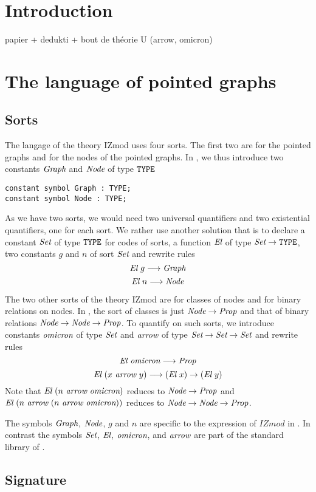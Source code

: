 \documentclass[a4paper]{article}
\begin{document}
\thispagestyle{empty}
\section{Introduction}

papier + dedukti + bout de théorie U (arrow, omicron)

\section{The language of pointed graphs}

\subsection{Sorts}

The langage of the theory IZmod uses four sorts. The first two are for
the pointed graphs and for the nodes of the pointed graphs.  In
\dedukti, we thus introduce two constants ${\mbox{\it Graph}}$ and ${\mbox{\it Node}}$ of type
$\mbox{\tt TYPE}$
\begin{lstlisting}
constant symbol Graph : TYPE;
constant symbol Node : TYPE;
\end{lstlisting}
As we have two sorts, we would need two universal quantifiers and two
existential quantifiers, one for each sort.  We rather use another
solution \cite{theoryU} that is to declare a constant $\mbox{\it Set}$ of type
$\mbox{\tt TYPE}$ for codes of sorts, a function ${\mbox{\it El}}$ of type $\mbox{\it Set} \rightarrow \mbox{\tt TYPE}$,
two constants $g$ and $n$ of sort $\mbox{\it Set}$ and rewrite rules
$${\mbox{\it El}}~g \longrightarrow {\mbox{\it Graph}}$$
$${\mbox{\it El}}~n \longrightarrow {\mbox{\it Node}}$$

The two other sorts of the theory IZmod are for classes of nodes and
for binary relations on nodes.  In \dedukti, the sort of classes is
just ${\mbox{\it Node}} \rightarrow {\mbox{\it Prop}}$ and that of binary relations
${\mbox{\it Node}} \rightarrow {\mbox{\it Node}} \rightarrow {\mbox{\it Prop}}$. To quantify on such sorts, we introduce
constants ${\mbox{\it omicron}}$ of type $\mbox{\it Set}$ and ${\mbox{\it arrow}} $ of type
$\mbox{\it Set} \rightarrow \mbox{\it Set} \rightarrow \mbox{\it Set}$ and rewrite rules
$${\mbox{\it El}}~{\mbox{\it omicron}} \longrightarrow {\mbox{\it Prop}}$$
$${\mbox{\it El}}~(x~{\mbox{\it arrow}}~y) \longrightarrow ({\mbox{\it El}}~x) \rightarrow ({\mbox{\it El}}~y)$$
Note that ${\mbox{\it El}}~(n~{\mbox{\it arrow}}~{\mbox{\it omicron}})$ reduces to ${\mbox{\it Node}} \rightarrow {\mbox{\it Prop}}$ and 
${\mbox{\it El}}~(n~{\mbox{\it arrow}}~(n~{\mbox{\it arrow}}~{\mbox{\it omicron}}))$ reduces to ${\mbox{\it Node}} \rightarrow {\mbox{\it Node}} \rightarrow {\mbox{\it Prop}}$. 

The symbols ${\mbox{\it Graph}}$, ${\mbox{\it Node}}$, $g$ and $n$ are specific to the
expression of $IZmod$ in \dedukti. In contrast the symbols $\mbox{\it Set}$,
${\mbox{\it El}}$, ${\mbox{\it omicron}}$, and ${\mbox{\it arrow}}$ are part of the standard library of 
\dedukti.

\subsection{Signature}
\end{document}
